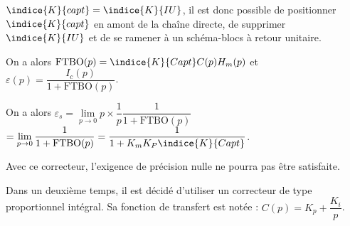 \fi

\ifprof
\begin{corrige}
$\indice{K}{capt}=\indice{K}{IU}$, il est donc possible de positionner $\indice{K}{capt}$ en amont de la chaîne directe, de supprimer $\indice{K}{IU}$ et de se ramener à un schéma-blocs à retour unitaire. 

On a alors $\text{FTBO}(p)=\indice{K}{Capt}C(p)H_m(p)$ et 
$\varepsilon(p)=\dfrac{I_c(p)}{1+\text{FTBO}(p)}$.

On a alors $\varepsilon_s = \lim\limits_{p \to 0 } p\times\dfrac{1}{p}\dfrac{1}{1+\text{FTBO}(p)}$  
$= \lim\limits_{p \to 0 } \dfrac{1}{1+\text{FTBO}(p)} = \dfrac{1}{1+K_m K_P \indice{K}{Capt}} $.
\end{corrige}
\else
\fi

%
%


\ifprof
\begin{corrige}
Avec ce correcteur, l'exigence de précision nulle ne pourra pas être satisfaite.
\end{corrige}
\else
\fi

\ifprof
\else

Dans un deuxième temps, il est décidé d’utiliser un correcteur de type proportionnel intégral. Sa fonction de transfert est notée : $C(p)=K_p+\dfrac{K_i}{p}$.
\fi

%
%

